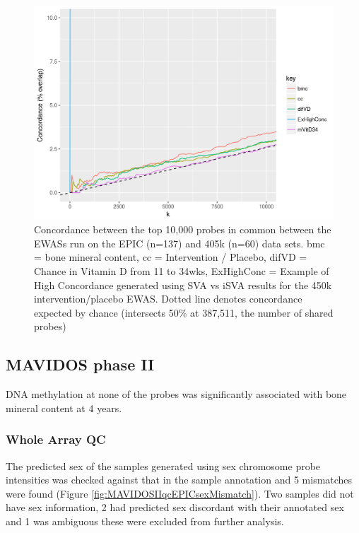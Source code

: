 \documentclass[
]{book}
\begin{document}
\begin{figure}

{\centering \includegraphics[width=0.8\linewidth]{figs/EPIC450kEWASconcordMAVIDOSMonApr162018zoom} 

}

\caption{Concordance between the top 10,000 probes in common between the EWASs run on the EPIC (n=137) and 405k (n=60) data sets. bmc = bone mineral content, cc = Intervention / Placebo, difVD = Chance in Vitamin D from 11 to 34wks, ExHighConc = Example of High Concordance generated using SVA vs iSVA results for the 450k intervention/placebo EWAS. Dotted line denotes concordance expected by chance (intersects 50\% at 387,511, the number of shared probes)}\label{fig:EPIC450kEWASconcordMAVIDOSMonApr162018zoom}
\end{figure}



\hypertarget{mavidos-phase-ii}{%
\subsection{MAVIDOS phase II}\label{mavidos-phase-ii}}

DNA methylation at none of the probes was significantly associated with bone mineral content at 4 years.

\hypertarget{whole-array-qc-1}{%
\subsubsection{Whole Array QC}\label{whole-array-qc-1}}

The predicted sex of the samples generated using sex chromosome probe intensities was checked against that in the sample annotation and 5 mismatches were found (Figure \ref{fig:MAVIDOSIIqcEPICsexMismatch}).
Two samples did not have sex information, 2 had predicted sex discordant with their annotated sex and 1 was ambiguous these were excluded from further analysis.
\end{document}
